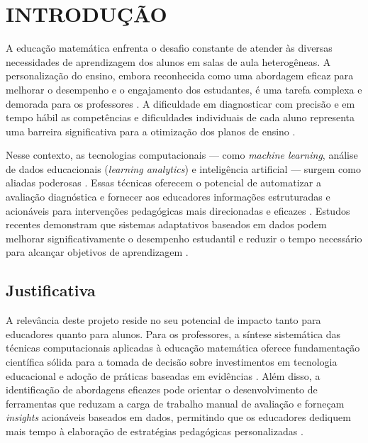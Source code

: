 \chapter{INTRODUÇÃO}
\label{cap:introducao}

A educação matemática enfrenta o desafio constante de atender às diversas necessidades de aprendizagem dos alunos em salas de aula heterogêneas. A personalização do ensino, embora reconhecida como uma abordagem eficaz para melhorar o desempenho e o engajamento dos estudantes, é uma tarefa complexa e demorada para os professores \cite{Innovative2023_005, Design2025_004}. A dificuldade em diagnosticar com precisão e em tempo hábil as competências e dificuldades individuais de cada aluno representa uma barreira significativa para a otimização dos planos de ensino \cite{Authentic2024_013}.

Nesse contexto, as tecnologias computacionais — como \textit{machine learning}, análise de dados educacionais (\textit{learning analytics}) e inteligência artificial — surgem como aliadas poderosas \cite{Machine2019_007, Implementation2025_000}. Essas técnicas oferecem o potencial de automatizar a avaliação diagnóstica e fornecer aos educadores informações estruturadas e acionáveis para intervenções pedagógicas mais direcionadas e eficazes \cite{Math2021_001, Multimodels2020_002}. Estudos recentes demonstram que sistemas adaptativos baseados em dados podem melhorar significativamente o desempenho estudantil e reduzir o tempo necessário para alcançar objetivos de aprendizagem \cite{Assessing2024_015}.

\section{Justificativa}

A relevância deste projeto reside no seu potencial de impacto tanto para educadores quanto para alunos. Para os professores, a síntese sistemática das técnicas computacionais aplicadas à educação matemática oferece fundamentação científica sólida para a tomada de decisão sobre investimentos em tecnologia educacional e adoção de práticas baseadas em evidências \cite{Identifying2017_006}. Além disso, a identificação de abordagens eficazes pode orientar o desenvolvimento de ferramentas que reduzam a carga de trabalho manual de avaliação e forneçam \textit{insights} acionáveis baseados em dados, permitindo que os educadores dediquem mais tempo à elaboração de estratégias pedagógicas personalizadas \cite{Performance2023_014}.

